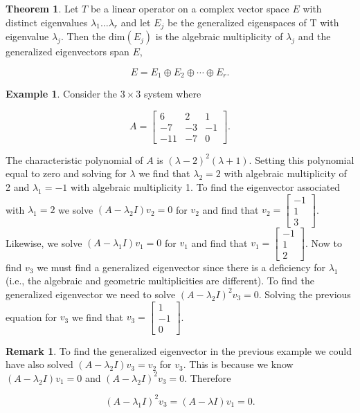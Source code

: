 \documentclass[12pt]{article}
\theoremstyle{definition}
\newtheorem*{example}{Example}
\newtheorem{theorem}{Theorem}[section]  %
\newtheorem*{remark}{Remark}
\begin{document}
\begin{theorem}
Let $T$ be a linear operator on a complex vector space $E$ with distinct eigenvalues $\lambda_1 \ldots \lambda_r$ and let
$E_j$ be the generalized eigenspaces of T with eigenvalue $\lambda_j$. Then the $\text{dim}(E_j)$ is the algebraic
multiplicity of $\lambda_j$ and the generalized eigenvectors span $E$,

\begin{equation*}
E = E_1 \oplus E_2 \oplus \cdots \oplus E_r.
\end{equation*}
\end{theorem}


\begin{example}
Consider the $3 \times 3$ system where

\[
A =
\begin{bmatrix}
6 & 2 & 1 \\
-7 & -3 & -1 \\
-11 & -7 & 0
\end{bmatrix}.
\]

The characteristic polynomial of $A$ is $(\lambda - 2)^2 (\lambda + 1)$. Setting this polynomial equal to zero and solving for
$\lambda$ we find that $\lambda_2 = 2$ with algebraic multiplicity of 2 and $\lambda_1 = -1$ with algebraic multiplicity 1. To
find the eigenvector associated with $\lambda_1 = 2$ we solve $(A - \lambda_2 I)v_2 = 0$ for $v_2$ and find that
$v_2 = \begin{bmatrix} -1 \\ 1 \\ 3 \end{bmatrix}$. Likewise, we solve $(A - \lambda_1 I) v_1 = 0$ for $v_1$ and find that
$v_1 = \begin{bmatrix} -1 \\ 1 \\ 2 \end{bmatrix}$. Now to find $v_3$ we must find a generalized eigenvector since there is
a deficiency for $\lambda_1$ (i.e., the algebraic and geometric multiplicities are different). To find the generalized
eigenvector we need to solve $(A - \lambda_2 I)^2 v_3 = 0$. Solving the previous equation for $v_3$ we find that
$v_3 = \begin{bmatrix} 1 \\ -1 \\ 0 \end{bmatrix}$.
\end{example}

\begin{remark}
To find the generalized eigenvector in the previous example we could have also solved $(A - \lambda_2 I)v_3 = v_2$ for $v_3$. 
This is because we know $(A - \lambda_2 I) v_1 = 0$ and $(A - \lambda_2 I)^2 v_3 = 0$. Therefore

\[
(A - \lambda_1 I )^2 v_3 = (A - \lambda I) v_1 = 0.
\]
\end{remark}
\end{document}

